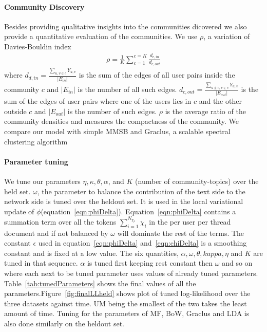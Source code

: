 \documentclass{sig-alternate}
\begin{document}
\vspace*{-0.5\baselineskip}
\paragraph{Community Discovery}
Besides providing qualitative insights into the communities dicovered
we also provide a quantitative evaluation of the communities. We use 
$\rho$, a variation of Davies-Bouldin index~\cite{Davies:1979} 
\vspace*{-0.5\baselineskip}
\small
\begin{align}
	\rho=\frac{1}{K} \sum_{c=1}^{c=K}\frac{d_{c,in}}{d_{c,out}}
\end{align}
\normalsize
where $d_{d,in}=\frac{\sum_{u,v\in c}Y_{u,v}}{|E_{in}|}$ is the sum of the 
edges of all user pairs inside the community $c$ and $|E_{in}|$ is the number of 
all such edges. $d_{c,out}=\frac{\sum_{u\notin c,v\in c}Y_{u,v}}{|E_{out}|}$ is the 
sum of the edges of user pairs where one of the users lies in $c$ and the other 
outside $c$ and $|E_{out}|$ is the number of such edges. 
$\rho$ is the average ratio of the community densities and measures 
the compactness of the community.
We compare our model with simple MMSB and Graclus, a scalable spectral clustering
algorithm~\cite{Dhillon:2005}

\vspace*{-0.5\baselineskip}
\paragraph{Parameter tuning}
We tune our parameters $\eta, \kappa,
\theta, \alpha$, and $K$ (number of community-topics) over the held set.
$\omega$, the parameter to balance the contribution of the text side to the 
network side is tuned over the
heldout set. It is used in the local variational update of
$\phi$(equation~\ref{eqn:phiDelta}).
Equation~\ref{eqn:phiDelta} contains a summation term over all the tokens
$\sum_{i=1}^{N_{T_p}}\chi_i$ in the per user per thread document and if  not
balanced by $\omega$ will dominate the rest of the terms. The constant $\epsilon$ used in
equation~\ref{eqn:phiDelta} and~\ref{eqn:chiDelta} is a smoothing constant and
is fixed at a low value. The six quantities, $\alpha, \omega, \theta, kappa,
\eta$ and $K$ are tuned in that sequence. $\alpha$ is tuned first keeping rest
constant then $\omega$ and so on where each next to be tuned parameter uses
values of already tuned parameters. Table~\ref{tab:tunedParameters}
shows the final values of all the parameters.Figure~\ref{fig:finalLLheld} 
shows plot of tuned log-likelihood over the three
datasets against time. UM being the smallest of the two takes
the least amount of time. Tuning for the parameters of MF, BoW, Graclus and LDA
is also done similarly on the heldout set.
\end{document}
